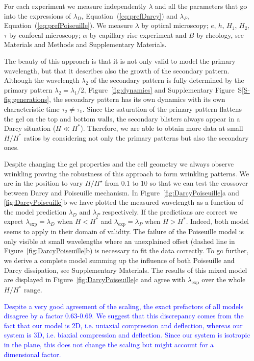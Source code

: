 \documentclass[twocolumn,superscriptaddress,showpacs,preprintnumbers, amsmath,amssymb,prl]{revtex4-1}
\begin{document}
For each experiment we measure independently $\lambda$ and all the parameters that go into the expressions of $\lambda_D$, Equation~(\ref{eq:prefDarcy}) and $\lambda_P$, Equation~(\ref{eq:prefPoiseuille}). We measure $\lambda$ by optical microscopy; $e$, $h$, $H_1$, $H_2$, $\tau$ by confocal microscopy; $\alpha$ by capillary rise experiment and $B$ by rheology, see Materials and Methods and Supplementary Materials.


The beauty of this approach is that it is not only valid to model the primary wavelength, but that it describes also the growth of the secondary pattern. Although the wavelength $\lambda_2$ of the secondary pattern is fully determined by the primary pattern $\lambda_2 = \lambda_1/2$, Figure~\ref{fig:dynamics} and Supplementary Figure~S\ref{S-fig:generations}, the secondary pattern has its own dynamics with its own characteristic time $\tau_2\neq\tau_1$. Since the saturation of the primary pattern flattens the gel on the top and bottom walls, the secondary blisters always appear in a Darcy situation ($H\ll H^*$). Therefore, we are able to obtain more data at small $H/H^*$ ratios by considering not only the primary patterns but also the secondary ones.


Despite changing the gel properties and the cell geometry we always observe wrinkling proving the robustness of this approach to form wrinkling patterns. We are in the position to vary $H/H^\star$ from 0.1 to 10 so that we can test the crossover between Darcy and Poiseuille mechanism. In Figure~\ref{fig:DarcyPoiseuille}a and \ref{fig:DarcyPoiseuille}b we have plotted the measured wavelength as a function of the model prediction $\lambda_D$ and $\lambda_P$ respectively. If the predictions are correct we expect $\lambda_\text{exp}=\lambda_D$ when $H<H^*$ and $\lambda_\text{exp}=\lambda_P$ when $H>H^*$. Indeed, both model seems to apply in their domain of validity. The failure of the Poiseuille model is only visible at small wavelengths where an unexplained offset (dashed line in Figure~\ref{fig:DarcyPoiseuille}b) is necessary to fit the data correctly. To go further, we derive a complete model summing up the influence of both Poiseuille and Darcy dissipation, see Supplementary Materials. The results of this mixed model are displayed in Figure~\ref{fig:DarcyPoiseuille}c and agree with $\lambda_\text{exp}$ over the whole $H/H^*$ range.

\textcolor{blue}{Despite a very good agreement of the scaling, the exact prefactors of all models disagree by a factor 0.63-0.69. We suggest that this discrepancy comes from the fact that our model is 2D, i.e. uniaxial compression and deflection, whereas our system is 3D, i.e. biaxial compression and deflection. Since our system is isotropic in the plane, this does not change the scaling but might account for a dimensional factor.}
\end{document}
